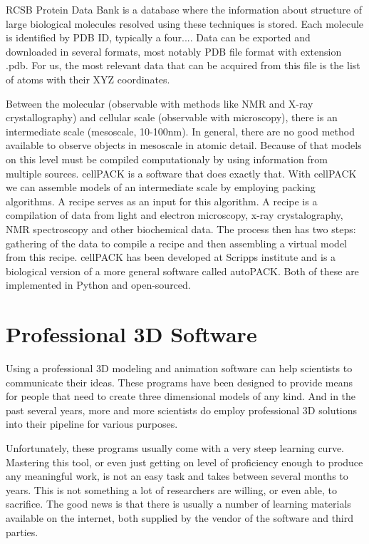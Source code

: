 \documentclass[
  digital, %
  table,   %
  nolof,     %
  nolot,     %
]{fithesis3}
\begin{document}
RCSB Protein Data Bank is a database where the information about structure of large biological molecules resolved using these techniques is stored. Each molecule is identified by PDB ID, typically a four.... Data can be exported and downloaded in several formats, most notably PDB file format with extension .pdb. For us, the most relevant data that can be acquired from this file is the list of atoms with their XYZ coordinates.

Between the molecular (observable with methods like NMR and X-ray crystallography) and cellular scale (observable with microscopy), there is an intermediate scale (mesoscale, 10-100nm). In general, there are no good method available to observe objects in mesoscale in atomic detail. Because of that models on this level must be compiled computationaly by using information from multiple sources. cellPACK\cite{cellPACK} is a software that does exactly that. With cellPACK we can assemble models of an intermediate scale by employing packing algorithms. A recipe serves as an input for this algorithm. A recipe is a compilation of data from light and electron microscopy, x-ray crystalography, NMR spectroscopy and other biochemical data. The process then has two steps: gathering of the data to compile a recipe and then assembling a virtual model from this recipe. cellPACK has been developed at Scripps institute and is a biological version of a more general software called autoPACK. Both of these are implemented in Python and open-sourced.

\section{Professional 3D Software}
Using a professional 3D modeling and animation software can help scientists to communicate their ideas. These programs have been designed to provide means for people that need to create three dimensional models of any kind. And in the past several years, more and more scientists do employ professional 3D solutions into their pipeline for various purposes.

Unfortunately, these programs usually come with a very steep learning curve. Mastering this tool, or even just getting on level of proficiency enough to produce any meaningful work, is not an easy task and takes between several months to years. This is not something a lot of researchers are willing, or even able, to sacrifice. The good news is that there is usually a number of learning materials available on the internet, both supplied by the vendor of the software and third parties.
\end{document}
